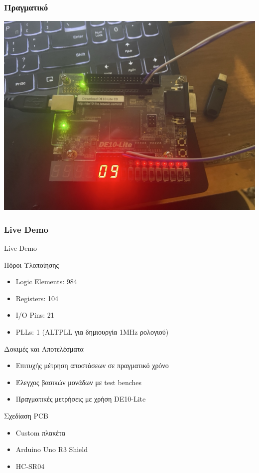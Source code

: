 \documentclass{beamer}
\begin{document}
\begin{frame}
\frametitle{Πραγματικό}
	\centerline{\includegraphics[angle=90, width=1\textwidth]{assets/echolite-real.jpeg}}
\end{frame}

\begin{frame}
\frametitle{Live Demo}
	Live Demo
\end{frame}

\begin{frame}{Πόροι Υλοποίησης}
\begin{itemize}
  \item Logic Elements: 984
  \item Registers: 104
  \item I/O Pins: 21
  \item PLLs: 1 (ALTPLL για δημιουργία 1MHz ρολογιού)
\end{itemize}
\end{frame}

\begin{frame}{Δοκιμές και Αποτελέσματα}
\begin{itemize}
  \item Επιτυχής μέτρηση αποστάσεων σε πραγματικό χρόνο
  \item Έλεγχος βασικών μονάδων με test benches
  \item Πραγματικές μετρήσεις με χρήση DE10-Lite
\end{itemize}
\end{frame}

\begin{frame}{Σχεδίαση PCB}
\begin{itemize}
  \item Custom πλακέτα
  \item Arduino Uno R3 Shield
  \item HC-SR04
\end{itemize}
\end{frame}
\end{document}
